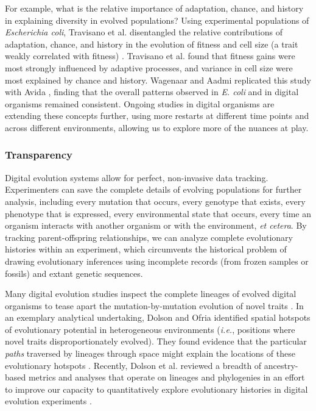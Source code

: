 For example, what is the relative importance of adaptation, chance, and history in explaining diversity in evolved populations? 
Using experimental populations of \textit{Escherichia coli}, Travisano et al. disentangled the relative contributions of adaptation, chance, and history in the evolution of fitness and cell size (a trait weakly correlated with fitness) \citep{travisano_experimental_1995}.
Travisano et al. found that fitness gains were most strongly influenced by adaptive processes, and variance in cell size were most explained by chance and history. 
Wagenaar and Aadmi replicated this study with Avida \citep{wagenaar_influence_2004}, finding that the overall patterns observed in \textit{E. coli} and in digital organisms remained consistent.
Ongoing studies in digital organisms are extending these concepts further, using more restarts at different time points and across different environments, allowing us to explore more of the nuances at play.

\subsubsection{Transparency}

Digital evolution systems allow for perfect, non-invasive data tracking.
Experimenters can save the complete details of evolving populations for further analysis, including every mutation that occurs, every genotype that exists, every phenotype that is expressed, every environmental state that occurs, every time an organism interacts with another organism or with the environment, \textit{et cetera}.
By tracking parent-offspring relationships, we can analyze complete evolutionary histories within an experiment, which circumvents the historical problem of drawing evolutionary inferences using incomplete records (from frozen samples or fossils) and extant genetic sequences.

Many digital evolution studies inspect the complete lineages of evolved digital organisms to tease apart the mutation-by-mutation evolution of novel traits \citep{lenski_evolutionary_2003,dolson_spatial_2017,grabowski_case_2013,goldsby_evolutionary_2014,pontes_evolutionary_2020}.
In an exemplary analytical undertaking, Dolson and Ofria identified spatial hotspots of evolutionary potential in heterogeneous environments (\textit{i.e.}, positions where novel traits disproportionately evolved).
They found evidence that the particular \textit{paths} traversed by lineages through space might explain the locations of these evolutionary hotspots \citep{dolson_hotspots_2017}. 
Recently, Dolson et al. reviewed a breadth of ancestry-based metrics and analyses that operate on lineages and phylogenies in an effort to improve our capacity to quantitatively explore evolutionary histories in digital evolution experiments \citep{dolson_interpreting_2020}.

